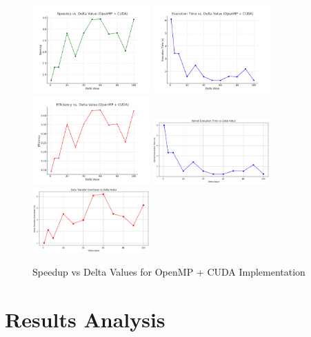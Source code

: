 \documentclass{article}
\begin{document}
\begin{figure}[h]
    \centering
    \includegraphics[width=0.4\textwidth]{speedup_vs_delta.png}
    \includegraphics[width=0.4\textwidth]{execution_time_vs_delta.png}
    \includegraphics[width=0.4\textwidth]{efficiency_vs_delta.png}
    \includegraphics[width=0.4\textwidth]{KernelTime.png}
    \includegraphics[width=0.4\textwidth]{kernelOverhead.png}

    \caption{Speedup vs Delta Values for OpenMP + CUDA Implementation}
    \label{fig:speedup_openmp_cuda}
\end{figure}

\section*{Results Analysis}
\end{document}
